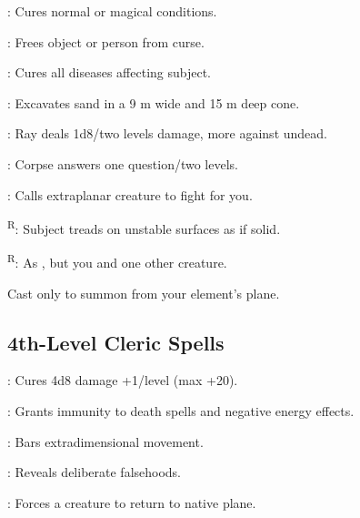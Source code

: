 : Cures normal or magical conditions.

: Frees object or person from curse.

: Cures all diseases affecting subject.

: Excavates sand in a 9 m wide and 15 m deep cone. %

: Ray deals 1d8/two levels damage, more against undead.

: Corpse answers one question/two levels.


\footnotemark[1]: Calls extraplanar creature to fight for you.

\textsuperscript{R}: Subject treads on unstable surfaces as if solid. %

\textsuperscript{R}: As , but you and one other creature.




 Cast only to summon from your element's plane.



\subsection{4th-Level Cleric Spells}



: Cures 4d8 damage +1/level (max +20).

: Grants immunity to death spells and negative energy effects.

: Bars extradimensional movement.

: Reveals deliberate falsehoods.

: Forces a creature to return to native plane.

